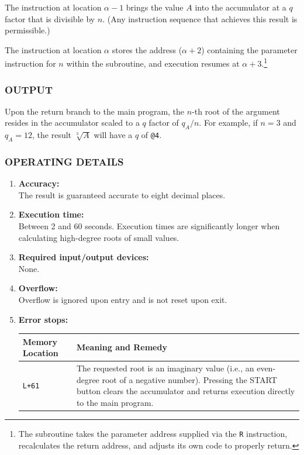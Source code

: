 \documentclass{article}
\begin{document}
\medskip
\noindent
The instruction at location $\alpha - 1$ brings the value $A$ into the accumulator at a $q$ factor that is divisible by $n$. (Any instruction sequence that achieves this result is permissible.) 

The instruction at location $\alpha$ stores the address ($\alpha + 2$) containing the parameter instruction for $n$ within the subroutine, and execution resumes at $\alpha+3$.\footnote{The subroutine takes the parameter address supplied via the \texttt{R} instruction, recalculates the return address, and adjusts its own code to properly return.}

\subsubsection*{OUTPUT}
\noindent
Upon the return branch to the main program, the $n$-th root of the argument resides in the accumulator scaled to a $q$ factor of $q_A / n$. For example, if $n = 3$ and $q_A = 12$, the result $\sqrt[3]{A}$ will have a $q$ of \texttt{@4}.

\subsubsection*{OPERATING DETAILS}

\begin{enumerate}[leftmargin=1.5em, itemsep=6pt]
    \item \textbf{Accuracy:} \\
    The result is guaranteed accurate to eight decimal places.
    
    \item \textbf{Execution time:} \\
    Between 2 and 60 seconds. Execution times are significantly longer when calculating high-degree roots of small values.
    
    \item \textbf{Required input/output devices:} \\
    None.
    
    \item \textbf{Overflow:} \\
    Overflow is ignored upon entry and is not reset upon exit.
    
    \item \textbf{Error stops:} \\
    \begin{tabular}{lp{9cm}}
        \toprule
        \textbf{Memory Location} & \textbf{Meaning and Remedy} \\
        \midrule
        \texttt{L+61}            & The requested root is an imaginary value (i.e., an even-degree root of a negative number). Pressing the \textsf{START} button clears the accumulator and returns execution directly to the main program. \\
        \bottomrule
    \end{tabular}
\end{enumerate}
\newpage
\end{document}
